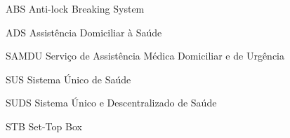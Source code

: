 \begin{siglas}
  \item[ABS] Anti-lock Breaking System
  \item[ADS] Assistência Domiciliar à Saúde 
  \item[SAMDU] Serviço de Assistência Médica Domiciliar e de Urgência 
  \item[SUS] Sistema Único de Saúde 
  \item[SUDS] Sistema Único e Descentralizado de Saúde 
  \item[STB] Set-Top Box
\end{siglas}